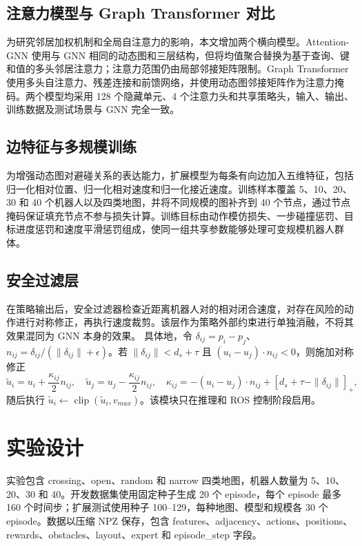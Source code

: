 \documentclass[UTF8,a4paper,11pt]{ctexart}
\begin{document}
\subsection{注意力模型与 Graph Transformer 对比}
为研究邻居加权机制和全局自注意力的影响，本文增加两个横向模型。Attention-GNN 使用与 GNN 相同的动态图和三层结构，但将均值聚合替换为基于查询、键和值的多头邻居注意力；注意力范围仍由局部邻接矩阵限制。Graph Transformer 使用多头自注意力、残差连接和前馈网络，并使用动态图邻接矩阵作为注意力掩码。两个模型均采用 128 个隐藏单元、4 个注意力头和共享策略头，输入、输出、训练数据及测试场景与 GNN 完全一致。

\subsection{边特征与多规模训练}
为增强动态图对避碰关系的表达能力，扩展模型为每条有向边加入五维特征，包括归一化相对位置、归一化相对速度和归一化接近速度。训练样本覆盖 5、10、20、30 和 40 个机器人以及四类地图，并将不同规模的图补齐到 40 个节点，通过节点掩码保证填充节点不参与损失计算。训练目标由动作模仿损失、一步碰撞惩罚、目标进度惩罚和速度平滑惩罚组成，使同一组共享参数能够处理可变规模机器人群体。

\subsection{安全过滤层}
在策略输出后，安全过滤器检查近距离机器人对的相对闭合速度，对存在风险的动作进行对称修正，再执行速度裁剪。该层作为策略外部约束进行单独消融，不将其效果混同为 GNN 本身的效果。
具体地，令 $\delta_{ij}=p_i-p_j$、$n_{ij}=\delta_{ij}/(\|\delta_{ij}\|+\epsilon)$。若 $\|\delta_{ij}\|<d_s+\tau$ 且 $(u_i-u_j)\cdot n_{ij}<0$，则施加对称修正
\begin{equation}
 \tilde u_i=u_i+\frac{\kappa_{ij}}{2}n_{ij},\quad
 \tilde u_j=u_j-\frac{\kappa_{ij}}{2}n_{ij},\quad
 \kappa_{ij}=-(u_i-u_j)\cdot n_{ij}+[d_s+\tau-\|\delta_{ij}\|]_+,
\end{equation}
随后执行 $\tilde u_i\leftarrow\operatorname{clip}(\tilde u_i,v_{max})$。该模块只在推理和 ROS 控制阶段启用。

\section{实验设计}
实验包含 crossing、open、random 和 narrow 四类地图，机器人数量为 5、10、20、30 和 40。开发数据集使用固定种子生成 20 个 episode，每个 episode 最多 160 个时间步；扩展测试使用种子 100--129，每种地图、模型和规模各 30 个 episode。数据以压缩 NPZ 保存，包含 features、adjacency、actions、positions、rewards、obstacles、layout、expert 和 episode\_step 字段。
\end{document}

